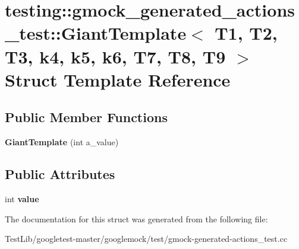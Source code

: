 \hypertarget{structtesting_1_1gmock__generated__actions__test_1_1GiantTemplate}{}\section{testing\+:\+:gmock\+\_\+generated\+\_\+actions\+\_\+test\+:\+:Giant\+Template$<$ T1, T2, T3, k4, k5, k6, T7, T8, T9 $>$ Struct Template Reference}
\label{structtesting_1_1gmock__generated__actions__test_1_1GiantTemplate}
\subsection*{Public Member Functions}
\begin{DoxyCompactItemize}
\item 
\mbox{\label{structtesting_1_1gmock__generated__actions__test_1_1GiantTemplate_aaa836b162de31fbd538ffcbed448f430}} 
{\bfseries Giant\+Template} (int a\+\_\+value)
\end{DoxyCompactItemize}
\subsection*{Public Attributes}
\begin{DoxyCompactItemize}
\item 
\mbox{\label{structtesting_1_1gmock__generated__actions__test_1_1GiantTemplate_afa0f7a8e5ac8c8b7c59d60ad66980856}} 
int {\bfseries value}
\end{DoxyCompactItemize}


The documentation for this struct was generated from the following file\+:\begin{DoxyCompactItemize}
\item 
Test\+Lib/googletest-\/master/googlemock/test/gmock-\/generated-\/actions\+\_\+test.\+cc\end{DoxyCompactItemize}
